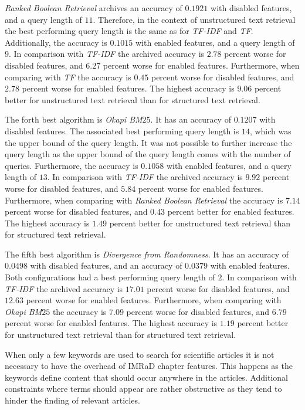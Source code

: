 \textit{Ranked Boolean Retrieval} archives an accuracy of $0.1921$ with disabled features, and a query length of $11$. Therefore, in the context of unstructured text retrieval the best performing query length is the same as for \textit{TF-IDF} and \textit{TF}. Additionally, the accuracy is $0.1015$ with enabled features, and a query length of $9$. In comparison with \textit{TF-IDF} the archived accuracy is $2.78$ percent worse for disabled features, and $6.27$ percent worse for enabled features. Furthermore, when comparing with \textit{TF} the accuracy is $0.45$ percent worse for disabled features, and $2.78$ percent worse for enabled features. The highest accuracy is $9.06$ percent better for unstructured text retrieval than for structured text retrieval.

The forth best algorithm is \textit{Okapi BM$25$}. It has an accuracy of $0.1207$ with disabled features. The associated best performing query length is $14$, which was the upper bound of the query length. It was not possible to further increase the query length as the upper bound of the query length comes with the number of queries. Furthermore, the accuracy is $0.1058$ with enabled features, and a query length of $13$. In comparison with \textit{TF-IDF} the archived accuracy is $9.92$ percent worse for disabled features, and $5.84$ percent worse for enabled features. Furthermore, when comparing with \textit{Ranked Boolean Retrieval} the accuracy is $7.14$ percent worse for disabled features, and $0.43$ percent better for enabled features. The highest accuracy is $1.49$ percent better for unstructured text retrieval than for structured text retrieval.

The fifth best algorithm is \textit{Divergence from Randomness}. It has an accuracy of $0.0498$ with disabled features, and an accuracy of $0.0379$ with enabled features. Both configurations had a best performing query length of $2$. In comparison with \textit{TF-IDF} the archived accuracy is $17.01$ percent worse for disabled features, and $12.63$ percent worse for enabled features. Furthermore, when comparing with \textit{Okapi BM$25$} the accuracy is $7.09$ percent worse for disabled features, and $6.79$ percent worse for enabled features. The highest accuracy is $1.19$ percent better for unstructured text retrieval than for structured text retrieval.

When only a few keywords are used to search for scientific articles it is not necessary to have the overhead of IMRaD chapter features. This happens as the keywords define content that should occur anywhere in the articles. Additional constraints where terms should appear are rather obstructive as they tend to hinder the finding of relevant articles.

